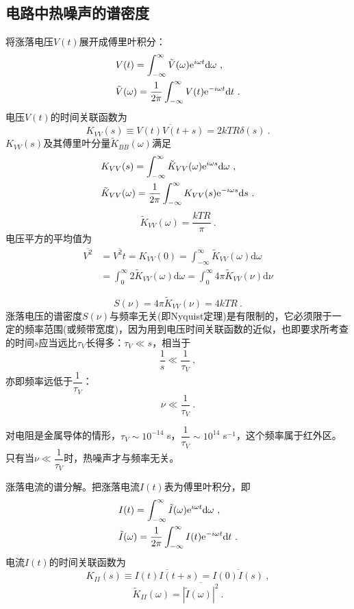 \documentclass[11pt,a4paper]{article}
\newcommand{\dif}{\mathrm{d}}
\begin{document}
\subsection{电路中热噪声的谱密度}
将涨落电压$V(t)$展开成傅里叶积分：
\begin{align}
& V(t) = \int_{-\infty}^\infty \tilde{V}(\omega) {\rm e}^{i\omega t} \dif \omega ~, \\
& \tilde{V}(\omega) = \dfrac{1}{2\pi} \int_{-\infty}^\infty  V(t)  {\rm e}^{-i\omega t} \dif t ~.
\end{align}
电压$V(t)$的时间关联函数为
\begin{equation}
K_{VV}(s)\equiv \overline{V(t) V(t+s)} = 2 k T R \delta(s) ~.
\end{equation}
$K_{VV}(s)$及其傅里叶分量$\tilde{K}_{BB}(\omega)$满足
\begin{align}
& K_{VV}(s) = \int_{-\infty}^\infty \tilde{K}_{VV}(\omega) {\rm e}^{i\omega s} \dif \omega ~, \\
& \tilde{K}_{VV}(\omega) = \dfrac{1}{2\pi} \int_{-\infty}^\infty K_{VV}(s) {\rm e}^{-i\omega s} \dif s ~.
\end{align}
\begin{equation}
\tilde{K}_{VV}(\omega) = \dfrac{kTR}{\pi} ~.
\end{equation}
电压平方的平均值为
\begin{align}
\nonumber \overline{V^2} &= \overline{V^2{t}} = K_{VV}(0) = \int_{-\infty}^\infty \tilde{K}_{VV}(\omega) \dif \omega \\
&= \int_0^\infty 2  \tilde{K}_{VV}(\omega) \dif \omega = \int_0^\infty 4 \pi  \tilde{K}_{VV}(\nu) \dif \nu
\end{align}

\begin{equation}
S(\nu) = 4\pi \tilde{K}_{VV}(\nu)  = 4 k T R ~.
\end{equation}
涨落电压的谱密度$S(\nu)$与频率无关(即Nyquist定理)是有限制的，它必须限于一定的频率范围(或频带宽度)，因为用到电压时间关联函数的近似，也即要求所考查的时间$s$应当远比$\tau_V$长得多：$\tau_V \ll s$，相当于$$\dfrac{1}{s} \ll \dfrac{1}{\tau_V} ~,$$亦即频率远低于$\dfrac{1}{\tau_V}$：$$\nu \ll \dfrac{1}{\tau_V} ~.$$

对电阻是金属导体的情形，$\tau_V \sim 10^{-14}$ s，$\dfrac{1}{\tau_V} \sim 10^{14}$ s$^{-1}$，这个频率属于红外区。只有当$\nu \ll \dfrac{1}{\tau_V} $时，热噪声才与频率无关。


涨落电流的谱分解。把涨落电流$I(t)$表为傅里叶积分，即
\begin{align}
& I(t) = \int_{-\infty}^\infty \tilde{I}(\omega) {\rm e}^{i\omega t} \dif \omega ~, \\
& \tilde{I}(\omega) = \dfrac{1}{2\pi} \int_{-\infty}^\infty I(t) {\rm e}^{-i\omega t} \dif t ~.
\end{align}
电流$I(t)$的时间关联函数为
\begin{equation}
K_{II}(s) \equiv \overline{I(t)I(t+s)} = \overline{I(0)I(s)} ~,
\end{equation}
\begin{equation}
\tilde{K}_{II}(\omega) = \overline{|\tilde{I}(\omega)|^2} ~.
\end{equation}
\end{document}
